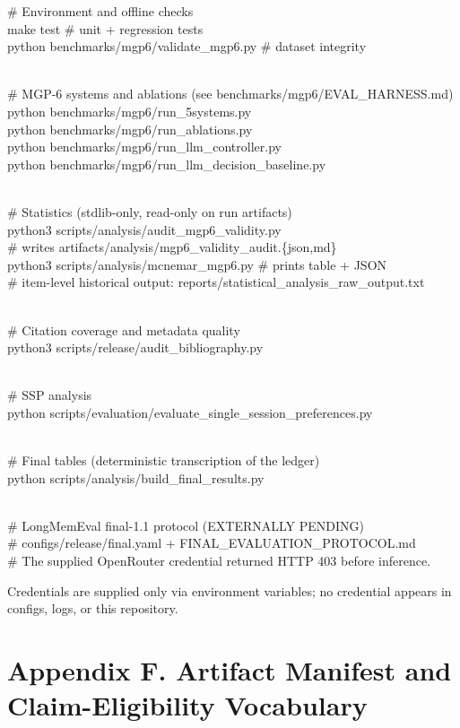 \# Environment and offline checks\\
make test \# unit + regression tests\\
python benchmarks/mgp6/validate\_mgp6.py \# dataset integrity\\
\strut \\
\# MGP-6 systems and ablations (see benchmarks/mgp6/EVAL\_HARNESS.md)\\
python benchmarks/mgp6/run\_5systems.py\\
python benchmarks/mgp6/run\_ablations.py\\
python benchmarks/mgp6/run\_llm\_controller.py\\
python benchmarks/mgp6/run\_llm\_decision\_baseline.py\\
\strut \\
\# Statistics (stdlib-only, read-only on run artifacts)\\
python3 scripts/analysis/audit\_mgp6\_validity.py\\
\# writes artifacts/analysis/mgp6\_validity\_audit.\{json,md\}\\
python3 scripts/analysis/mcnemar\_mgp6.py \# prints table + JSON\\
\# item-level historical output:
reports/statistical\_analysis\_raw\_output.txt\\
\strut \\
\# Citation coverage and metadata quality\\
python3 scripts/release/audit\_bibliography.py\\
\strut \\
\# SSP analysis\\
python scripts/evaluation/evaluate\_single\_session\_preferences.py\\
\strut \\
\# Final tables (deterministic transcription of the ledger)\\
python scripts/analysis/build\_final\_results.py\\
\strut \\
\# LongMemEval final-1.1 protocol (EXTERNALLY PENDING)\\
\# configs/release/final.yaml + FINAL\_EVALUATION\_PROTOCOL.md\\
\# The supplied OpenRouter credential returned HTTP 403 before
inference.

Credentials are supplied only via environment variables; no credential
appears in configs, logs, or this repository.

\section{Appendix F. Artifact Manifest and Claim-Eligibility
Vocabulary}\label{appendix-f.-artifact-manifest-and-claim-eligibility-vocabulary}

